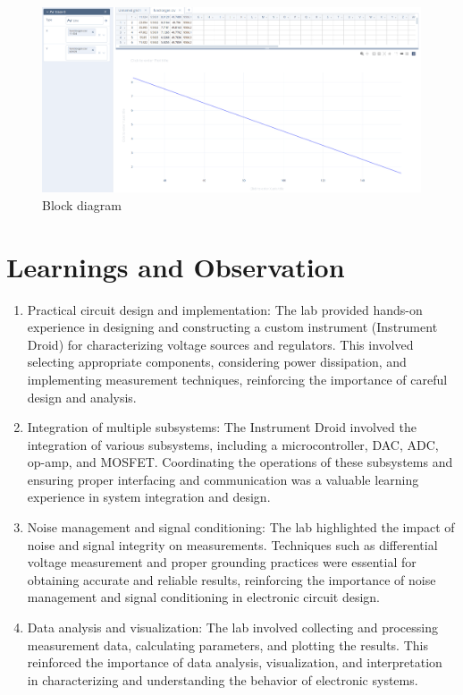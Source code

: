 \documentclass[a4paper,11pt]{article}%
\begin{document}
\begin{figure}[H]
	\centering
	\includegraphics[scale=0.30]{figures/function_generator.png}
  \caption{Block diagram}
  \label{fig:vrm_block_diagram}
\end{figure}


\section{Learnings and Observation}
\begin{enumerate}
  \item Practical circuit design and implementation: The lab provided hands-on experience in designing and constructing a custom instrument (Instrument Droid) for characterizing voltage sources and regulators. This involved selecting appropriate components, considering power dissipation, and implementing measurement techniques, reinforcing the importance of careful design and analysis.
  \item Integration of multiple subsystems: The Instrument Droid involved the integration of various subsystems, including a microcontroller, DAC, ADC, op-amp, and MOSFET. Coordinating the operations of these subsystems and ensuring proper interfacing and communication was a valuable learning experience in system integration and design.
  \item Noise management and signal conditioning: The lab highlighted the impact of noise and signal integrity on measurements. Techniques such as differential voltage measurement and proper grounding practices were essential for obtaining accurate and reliable results, reinforcing the importance of noise management and signal conditioning in electronic circuit design.
  \item Data analysis and visualization: The lab involved collecting and processing measurement data, calculating parameters, and plotting the results. This reinforced the importance of data analysis, visualization, and interpretation in characterizing and understanding the behavior of electronic systems.
\end{enumerate}
\end{document}
